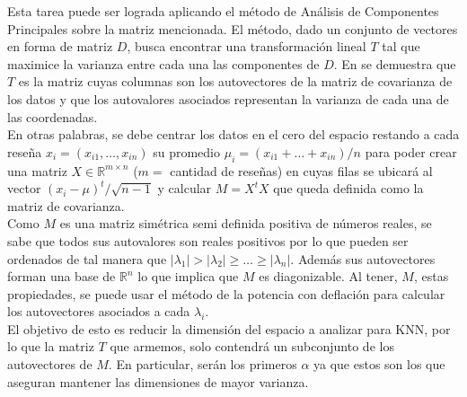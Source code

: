 Esta tarea puede ser lograda aplicando el método de Análisis de Componentes Principales sobre la matriz mencionada. El método, dado un conjunto de vectores en forma de matriz $D$, busca encontrar una transformación lineal  $T$ tal que maximice la varianza entre cada una las componentes de $D$. En \cite{Jolliffe2002Principal} se demuestra que $T$ es la matriz cuyas columnas son los autovectores de la matriz de covarianza de los datos y que los autovalores asociados representan la varianza de cada una de las coordenadas.\\

En otras palabras, se debe centrar los datos en el cero del espacio restando a cada reseña $x_i = (x_{i1},\dots,x_{in})$ su promedio $\mu_i = (x_{i1} + \dots + x_{in})/n$ para poder crear una matriz $X\in\mathbb{R}^{m\times n}$ ($m = $ cantidad de reseñas) en cuyas filas se ubicará al vector $(x_i - \mu)^t / \sqrt{n-1}$ y calcular $M = X^tX$ que queda definida como la matriz de covarianza. \\

Como $M$ es una matriz simétrica semi definida positiva de números reales, se sabe que todos sus autovalores son reales positivos por lo que pueden ser ordenados de tal manera que $|\lambda_1| > |\lambda_2|\geq\dots\geq|\lambda_n|$. Además sus autovectores forman una base de $\mathbb{R}^n$ lo que implica que $M$ es diagonizable. Al tener, $M$, estas propiedades, se puede usar el método de la potencia con deflación para calcular los autovectores asociados a cada $\lambda_i$. \\

El objetivo de esto es reducir la dimensión del espacio a analizar para KNN, por lo que la matriz $T$ que armemos, solo contendrá un subconjunto de los autovectores de $M$. En particular, serán los primeros $\alpha$ ya que estos son los que aseguran mantener las dimensiones de mayor varianza.









